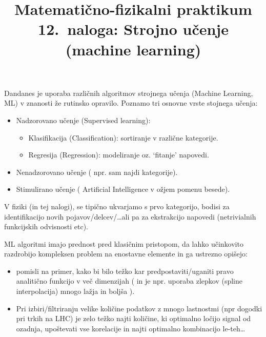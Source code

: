 \documentclass[slovene,11pt,a4paper]{article}
\title{
\sc\large Matematično-fizikalni praktikum\\
\bigskip
\bf\Large 12.~naloga: Strojno učenje (machine learning)
}
\author{}
\date{}
\begin{document}
\maketitle
\vspace{-1cm}

Dandanes je uporaba različnih algoritmov strojnega učenja (Machine Learning, ML) v 
znanosti že rutinsko opravilo. Poznamo tri osnovne vrste stojnega učenja:
\begin{itemize}
  \item Nadzorovano učenje (Supervised learning):
  \begin{itemize}
    \item Klasifikacija (Classification): sortiranje v različne kategorije.
    \item Regresija (Regression): modeliranje oz. `fitanje' napovedi.
  \end{itemize}
  \item Nenadzorovano učenje ( npr. sam najdi kategorije).
  \item Stimulirano učenje ( Artificial Intelligence v ožjem pomenu besede).
\end{itemize}
V fiziki (in tej nalogi), se tipično ukvarjamo s prvo kategorijo, bodisi za identifikacijo novih pojavov/delcev/\ldots ali pa za ekstrakcijo napovedi (netrivialnih funkcijskih odvisnosti etc).

ML algoritmi imajo prednost pred klasičnim pristopom, da lahko učinkovito razdrobijo kompleksen problem na enostavne elemente in ga ustrezno opišejo:
\begin{itemize}
  \item pomisli na primer, kako bi bilo težko kar predpostaviti/uganiti 
  pravo analitično funkcijo v več dimenzijah ( in je npr. uporaba zlepkov 
  (spline interpolacija) mnogo lažja in boljša ).
  \item Pri izbiri/filtriranju velike količine podatkov z mnogo lastnostmi 
  (npr dogodki pri trkih na LHC) je zelo težko najti količine, ki optimalno 
  ločijo signal od ozadnja, upoštevati vse korelacije in najti optimalno kombinacijo 
  le-teh\ldots
\end{itemize} 
\end{document}

